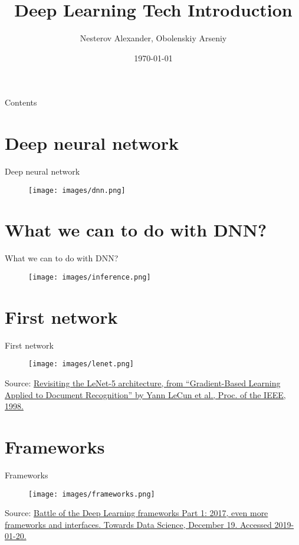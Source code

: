 \documentclass{beamer}
\title[Deep Learning Tech Introduction]{Deep Learning Tech Introduction}
\author{Nesterov Alexander, Obolenskiy Arseniy}
\institute{ITLab}
\date{\today}
\begin{document}
\begin{frame}
    \titlepage%
\end{frame}

\begin{frame}{Contents}
    \tableofcontents
\end{frame}

\section{Deep neural network}

\begin{frame}{Deep neural network}
  \begin{figure}[h]
    \texttt{[image: images/dnn.png]}
  \end{figure}
\end{frame}

\section{What we can to do with DNN?}
\begin{frame}{What we can to do with DNN?}
  \begin{figure}[h]
    \texttt{[image: images/inference.png]}
  \end{figure}
\end{frame}

\section{First network}
\begin{frame}{First network}
  \begin{figure}[h]
    \texttt{[image: images/lenet.png]}
  \end{figure}
  \footnotesize Source: \href{https://blog.insightdatascience.com/convolutional-neural-networks-explained-with-american-ninja-warrior-c6649875861c}{Revisiting the LeNet-5 architecture, from “Gradient-Based Learning Applied to Document Recognition” by Yann LeCun et al., Proc. of the IEEE, 1998.}
\end{frame}

\section{Frameworks}
\begin{frame}{Frameworks}
  \begin{figure}[h]
    \texttt{[image: images/frameworks.png]}
  \end{figure}
  \footnotesize Source: \href{https://devopedia.org/deep-learning-frameworks}{Battle of the Deep Learning frameworks Part 1: 2017, even more frameworks and interfaces. Towards Data Science, December 19. Accessed 2019-01-20.}
\end{frame}
\end{document}
